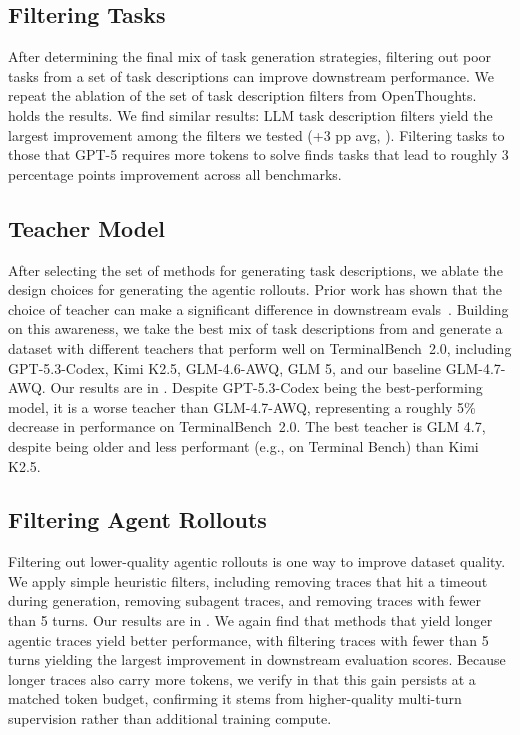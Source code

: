 \documentclass{article}
\begin{document}
\subsection{Filtering Tasks}
\label{sec:task_filtering}

After determining the final mix of task generation strategies, filtering out poor tasks from a set of task descriptions can improve downstream performance. We repeat the ablation of the set of task description filters from OpenThoughts.  holds the results. We find similar results: LLM task description filters yield the largest improvement among the filters we tested (+3 pp avg, ). Filtering tasks to those that GPT-5 requires more tokens to solve finds tasks that lead to roughly 3 percentage points improvement across all benchmarks.

\subsection{Teacher Model}
\label{sec:teacher_ablation}

After selecting the set of methods for generating task descriptions, we ablate the design choices for generating the agentic rollouts. Prior work has shown that the choice of teacher can make a significant difference in downstream evals~\citep{guha2025openthoughtsdatarecipesreasoning}. Building on this awareness, we take the best mix of task descriptions from  and generate a dataset with different teachers that perform well on TerminalBench~2.0, including GPT-5.3-Codex, Kimi K2.5, GLM-4.6-AWQ, GLM 5, and our baseline GLM-4.7-AWQ. Our results are in . Despite GPT-5.3-Codex being the best-performing model, it is a worse teacher than GLM-4.7-AWQ, representing a roughly 5\% decrease in performance on TerminalBench~2.0. The best teacher is GLM 4.7, despite being older and less performant (e.g., on Terminal Bench) than Kimi K2.5.



\subsection{Filtering Agent Rollouts}
\label{sec:trajectory_filtering}

Filtering out lower-quality agentic rollouts is one way to improve dataset quality. We apply simple heuristic filters, including removing traces that hit a timeout during generation, removing subagent traces, and removing traces with fewer than 5 turns. Our results are in . We again find that methods that yield longer agentic traces yield better performance, with filtering traces with fewer than 5 turns yielding the largest improvement in downstream evaluation scores.
Because longer traces also carry more tokens, we verify in  that this gain persists at a matched token budget, confirming it stems from higher-quality multi-turn supervision rather than additional training compute.
\end{document}
